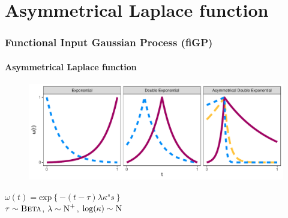 \documentclass{snedecorbeamer}
\begin{document}


\section{Asymmetrical Laplace function}

\begin{frame}
  \frametitle{Functional Input Gaussian Process (fiGP)}
  \framesubtitle{Asymmetrical Laplace function}

  \begin{figure}[h!]
	\centering
    \includegraphics[width=.7\textwidth]{02-alf-weight-plot}%
  \end{figure}
  \begin{center}
    $\omega(t) = \text{exp}\left\{-(t - \tau) \lambda \kappa^s s\right\}$\\
    $\tau \sim \textsc{Beta}$,
    $\lambda \sim \textsc{N}^{+}$,
    $\log(\kappa) \sim \textsc{N}$
  \end{center}

  \blankfootnote{
    $\omega(t): \mathcal{T} = [0, 1] \to (0, 1]$,
    $s = \text{sign}(t - \tau)$,
    $\tau > 0$,
    $\lambda > 0$,
    $\kappa > 0$
  }
\end{frame}
\end{document}
